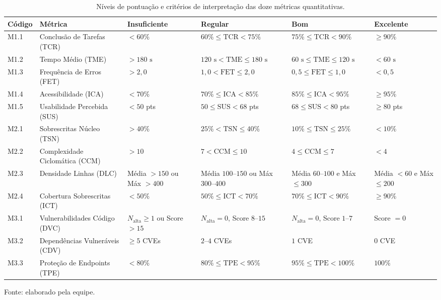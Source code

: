 \documentclass[journal]{IEEEtran}
\begin{document}
\begin{table}[!t]
\centering
\caption{Níveis de pontuação e critérios de interpretação das doze métricas quantitativas.}
\label{tab:julgamento}
\small
\begin{tabular}{@{}l p{} p{} p{} p{} p{}@{}}
\toprule
\textbf{Código} & \textbf{Métrica} & \textbf{Insuficiente} & \textbf{Regular} & \textbf{Bom} & \textbf{Excelente} \\
\midrule
M1.1 & Conclusão de Tarefas (TCR) & $< 60\%$ & $60\% \le \text{TCR} < 75\%$ & $75\% \le \text{TCR} < 90\%$ & $\ge 90\%$ \\
M1.2 & Tempo Médio (TME) & $> 180\text{ s}$ & $120\text{ s} < \text{TME} \le 180\text{ s}$ & $60\text{ s} \le \text{TME} \le 120\text{ s}$ & $< 60\text{ s}$ \\
M1.3 & Frequência de Erros (FET) & $> 2{,}0$ & $1{,}0 < \text{FET} \le 2{,}0$ & $0{,}5 \le \text{FET} \le 1{,}0$ & $< 0{,}5$ \\
M1.4 & Acessibilidade (ICA) & $< 70\%$ & $70\% \le \text{ICA} < 85\%$ & $85\% \le \text{ICA} < 95\%$ & $\ge 95\%$ \\
M1.5 & Usabilidade Percebida (SUS) & $< 50$ pts & $50 \le \text{SUS} < 68$ pts & $68 \le \text{SUS} < 80$ pts & $\ge 80$ pts \\
M2.1 & Sobrescritas Núcleo (TSN) & $> 40\%$ & $25\% < \text{TSN} \le 40\%$ & $10\% \le \text{TSN} \le 25\%$ & $< 10\%$ \\
M2.2 & Complexidade Ciclomática (CCM) & $> 10$ & $7 < \text{CCM} \le 10$ & $4 \le \text{CCM} \le 7$ & $< 4$ \\
M2.3 & Densidade Linhas (DLC) & Média $> 150$ ou Máx $> 400$ & Média $100\text{--}150$ ou Máx $300\text{--}400$ & Média $60\text{--}100$ e Máx $\le 300$ & Média $< 60$ e Máx $\le 200$ \\
M2.4 & Cobertura Sobrescritas (ICT) & $< 50\%$ & $50\% \le \text{ICT} < 70\%$ & $70\% \le \text{ICT} < 90\%$ & $\ge 90\%$ \\
M3.1 & Vulnerabilidades Código (DVC) & $N_{\text{alta}} \ge 1$ ou Score $> 15$ & $N_{\text{alta}} = 0$, Score $8\text{--}15$ & $N_{\text{alta}} = 0$, Score $1\text{--}7$ & Score $= 0$ \\
M3.2 & Dependências Vulneráveis (CDV) & $\ge 5$ CVEs & $2\text{--}4$ CVEs & $1$ CVE & $0$ CVE \\
M3.3 & Proteção de Endpoints (TPE) & $< 80\%$ & $80\% \le \text{TPE} < 95\%$ & $95\% \le \text{TPE} < 100\%$ & $100\%$ \\
\bottomrule
\end{tabular}

\vspace{2pt}
{\footnotesize Fonte: elaborado pela equipe.}

\end{table}
\end{document}
